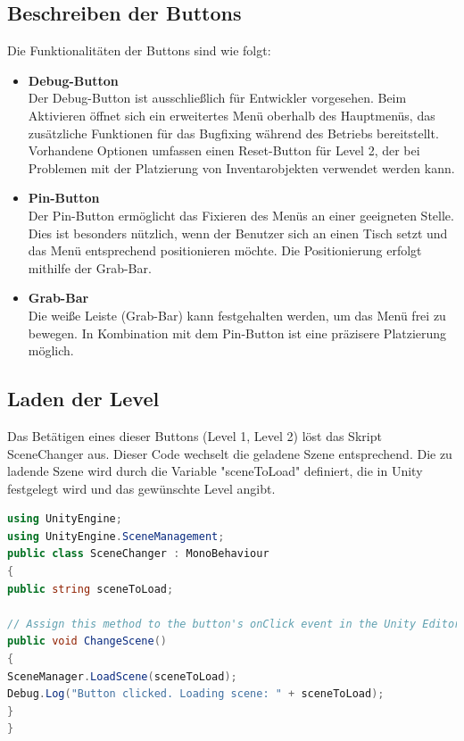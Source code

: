 \subsection{Beschreiben der Buttons}
Die Funktionalitäten der Buttons sind wie folgt:

\begin{itemize}
    \item \textbf{Debug-Button}\\
    Der Debug-Button ist ausschließlich für Entwickler vorgesehen. Beim Aktivieren öffnet sich ein erweitertes
    Menü oberhalb des Hauptmenüs, das zusätzliche Funktionen für das Bugfixing während des Betriebs bereitstellt.
    Vorhandene Optionen umfassen einen Reset-Button für Level 2, der bei Problemen mit der Platzierung von
    Inventarobjekten verwendet werden kann.

    \item \textbf{Pin-Button}\\
    Der Pin-Button ermöglicht das Fixieren des Menüs an einer geeigneten Stelle. Dies ist besonders nützlich,
    wenn der Benutzer sich an einen Tisch setzt und das Menü entsprechend positionieren möchte. Die
    Positionierung erfolgt mithilfe der Grab-Bar.

    \item \textbf{Grab-Bar}\\
    Die weiße Leiste (Grab-Bar) kann festgehalten werden, um das Menü frei zu bewegen. In Kombination mit dem
    Pin-Button ist eine präzisere Platzierung möglich.
\end{itemize}

\subsection{Laden der Level}
Das Betätigen eines dieser Buttons (Level 1, Level 2) löst das Skript SceneChanger aus. Dieser Code wechselt die geladene
Szene entsprechend. Die zu ladende Szene wird durch die Variable "sceneToLoad" definiert, die in Unity
festgelegt wird und das gewünschte Level angibt.


\begin{lstlisting}[language=C#, style=csharpstyle, caption=Auf Knopfdruck Szene wechseln.]
using UnityEngine;
using UnityEngine.SceneManagement;
public class SceneChanger : MonoBehaviour
{
public string sceneToLoad;

// Assign this method to the button's onClick event in the Unity Editor.
public void ChangeScene()
{
SceneManager.LoadScene(sceneToLoad);
Debug.Log("Button clicked. Loading scene: " + sceneToLoad);
}
}
\end{lstlisting}


